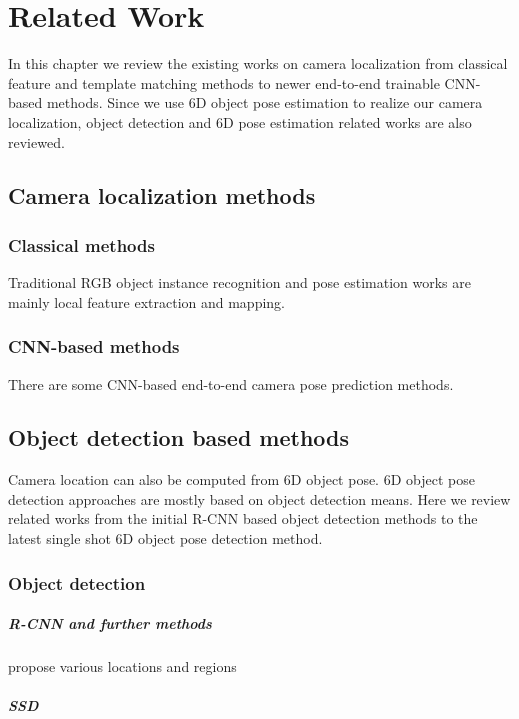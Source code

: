 \chapter{Related Work}

In this chapter we review the existing works on camera localization from classical feature and template matching methods to newer end-to-end trainable CNN-based methods. Since we use 6D object pose estimation to realize our camera localization, object detection and 6D pose estimation related works are also reviewed.

\section{Camera localization methods}

\subsection{Classical methods}

Traditional RGB object instance recognition and pose estimation works are mainly local feature extraction and mapping.

\subsection{CNN-based methods}
There are some CNN-based end-to-end camera pose prediction methods.

\section{Object detection based methods}
Camera location can also be computed from 6D object pose. 6D object pose detection approaches are mostly based on object detection means. Here we review related works from the initial R-CNN based object detection methods to the latest single shot 6D object pose detection method.

\subsection{Object detection}

\paragraph{R-CNN and further methods}
propose various locations and regions 

\paragraph{SSD}

